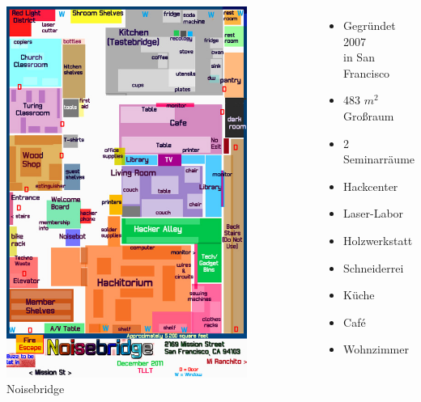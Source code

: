 \documentclass[aspectratio=1610]{beamer}
\begin{document}
  \begin{frame}
    \begin{columns}[l]
      \includegraphics[width=0.8\textwidth]{noisebridge-map.jpg}
      Noisebridge
      \begin{itemize}
        \item Gegründet 2007\\in San Francisco
        \item 483 $m^2$ Großraum
        \item 2 Seminarräume
        \item Hackcenter
        \item Laser-Labor
        \item Holzwerkstatt
        \item Schneiderrei
        \item Küche
        \item Café
        \item Wohnzimmer
      \end{itemize}
    \end{columns}
  \end{frame}
\end{document}
